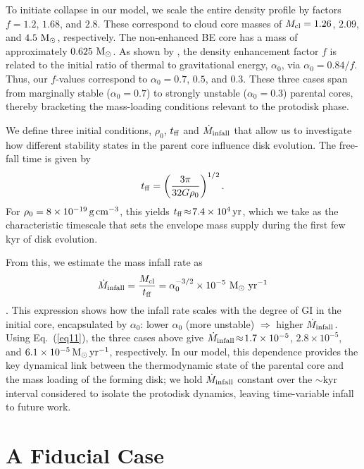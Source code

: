 \documentclass[twocolumn,linenumbers]{aastex631}
\begin{document}
To initiate collapse in our model, we scale the entire density profile by factors $f = 1.2$, $1.68$, and $2.8$. These correspond to cloud core masses of ${M}_{\rm cl} = 1.26$, $2.09$, and $4.5~{\rm M}_\odot$, respectively. The non-enhanced BE core has a mass of approximately $0.625~{\rm M}_\odot$. As shown by \cite{matsumoto2003fragmentation}, the density enhancement factor $f$ is related to the initial ratio of thermal to gravitational energy, $\alpha_0$, via $\alpha_0 = 0.84 / f$. Thus, our $f$-values correspond to $\alpha_0 = 0.7$, $0.5$, and $0.3$. These three cases span from marginally stable ($\alpha_0\!=\!0.7$) to strongly unstable ($\alpha_0\!=\!0.3$) parental cores, thereby bracketing the mass-loading conditions relevant to the protodisk phase.

We define three initial conditions, $\rho_0$, $t_{\rm ff}$ and $\dot{M}_{\rm infall}$ that allow us to investigate how different stability states in the parent core influence disk evolution. The free-fall time is given by
\begin{equation}
t_{\rm ff} = \left( \frac{3 \pi}{32 G \rho_{\rm 0}} \right)^{1/2}.
\end{equation}
For $\rho_0=8\times10^{-19}\,{\rm g\,cm^{-3}}$, this yields $t_{\rm ff}\!\approx\!7.4\times10^{4}\,{\rm yr}$, which we take as the characteristic timescale that sets the envelope mass supply during the first few kyr of disk evolution.

From this, we estimate the mass infall rate as
\begin{equation}
\dot{M}_{\rm infall} = \frac{M_{\rm cl}}{t_{\rm ff}} = \alpha_0^{-3/2} \times 10^{-5}~{\rm M}_\odot~{\rm yr}^{-1}
\label{eq11}
\end{equation}
\citep[see also][]{machida2011recurrent}.
This expression shows how the infall rate scales with the degree of GI in the initial core, encapsulated by $\alpha_0$: lower $\alpha_0$ (more unstable) $\Rightarrow$ higher $\dot{M}_{\rm infall}$. Using Eq.~(\ref{eq11}), the three cases above give $\dot{M}_{\rm infall}\!\approx\!1.7\times10^{-5}$, $2.8\times10^{-5}$, and $6.1\times10^{-5}\,{\rm M_\odot\,yr^{-1}}$, respectively. In our model, this dependence provides the key dynamical link between the thermodynamic state of the parental core and the mass loading of the forming disk; we hold $\dot{M}_{\rm infall}$ constant over the $\sim$kyr interval considered to isolate the protodisk dynamics, leaving time-variable infall to future work.



\section{A Fiducial Case} \label{fiducial}
\end{document}
